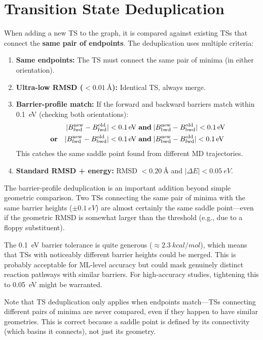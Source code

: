 \documentclass[11pt,a4paper]{article}
\begin{document}
\section{Transition State Deduplication}
\label{sec:ts-dedup}

When adding a new TS to the graph, it is compared against existing TSs that connect the \textbf{same pair of endpoints}. The deduplication uses multiple criteria:

\begin{enumerate}
    \item \textbf{Same endpoints:} The TS must connect the same pair of minima (in either orientation).
    \item \textbf{Ultra-low RMSD ($< \SI{0.01}{\angstrom}$):} Identical TS, always merge.
    \item \textbf{Barrier-profile match:} If the forward and backward barriers match within \SI{0.1}{eV} (checking both orientations):
    \begin{align}
        |B_\text{fwd}^\text{new} - B_\text{fwd}^\text{old}| &< \SI{0.1}{eV} \;\textbf{and}\; |B_\text{bwd}^\text{new} - B_\text{bwd}^\text{old}| < \SI{0.1}{eV} \notag \\
        \textbf{or}\quad |B_\text{fwd}^\text{new} - B_\text{bwd}^\text{old}| &< \SI{0.1}{eV} \;\textbf{and}\; |B_\text{bwd}^\text{new} - B_\text{fwd}^\text{old}| < \SI{0.1}{eV}
    \end{align}
    This catches the same saddle point found from different MD trajectories.
    \item \textbf{Standard RMSD + energy:} RMSD $< \SI{0.20}{\angstrom}$ and $|\Delta E| < \SI{0.05}{eV}$.
\end{enumerate}

\begin{evaluation}
The barrier-profile deduplication is an important addition beyond simple geometric comparison. Two TSs connecting the same pair of minima with the same barrier heights ($\pm\SI{0.1}{eV}$) are almost certainly the same saddle point---even if the geometric RMSD is somewhat larger than the threshold (e.g., due to a floppy substituent).

The \SI{0.1}{eV} barrier tolerance is quite generous ($\approx\SI{2.3}{kcal/mol}$), which means that TSs with noticeably different barrier heights could be merged. This is probably acceptable for ML-level accuracy but could mask genuinely distinct reaction pathways with similar barriers. For high-accuracy studies, tightening this to \SI{0.05}{eV} might be warranted.

Note that TS deduplication only applies when endpoints match---TSs connecting different pairs of minima are never compared, even if they happen to have similar geometries. This is correct because a saddle point is defined by its connectivity (which basins it connects), not just its geometry.
\end{evaluation}
\end{document}
